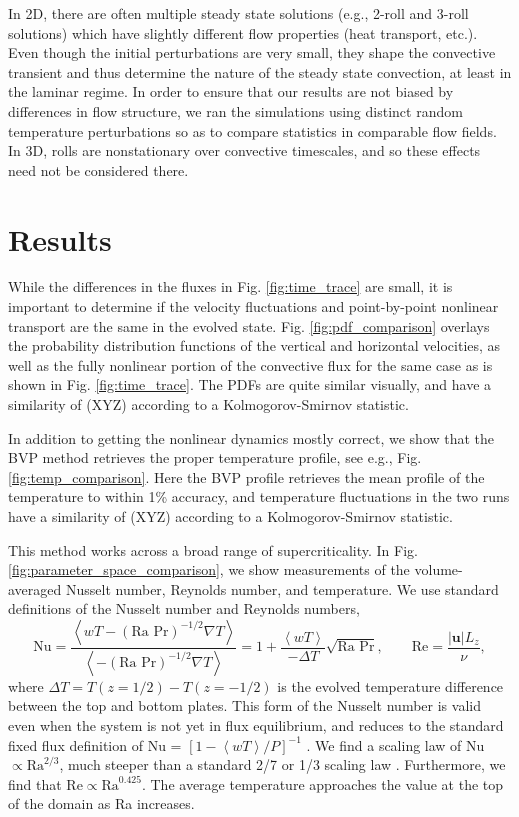 \documentclass[aps, pre, onecolumn, nofootinbib, notitlepage, groupedaddress, amsfonts, amssymb, amsmath, longbibliography]{revtex4-1}
\newcommand{\angles}[1]{\ensuremath{\left\langle #1 \right\rangle}}
\newcommand{\grad}{\ensuremath{\nabla}}
\begin{document}
In 2D, there are often multiple steady state solutions (e.g., 2-roll and 3-roll
solutions) which have slightly different flow properties (heat transport, etc.).
Even though the initial perturbations are very small, they shape the convective
transient and thus determine the nature of the steady state convection, at least in
the laminar regime.  In order to ensure that our results are not biased by differences
in flow structure, we ran the simulations using distinct random temperature perturbations
so as to compare statistics in comparable flow fields.  In 3D, rolls are nonstationary over
convective timescales, and so these effects need not be considered there.

\section{Results}
While the differences in the fluxes in Fig. \ref{fig:time_trace} are small, it is important
to determine if the velocity fluctuations and point-by-point nonlinear transport are the same
in the evolved state.  Fig. \ref{fig:pdf_comparison} overlays the probability distribution functions
of the vertical and horizontal velocities, as well as the fully nonlinear portion of the convective
flux for the same case as is shown in Fig. \ref{fig:time_trace}.  The PDFs are quite similar visually,
and have a similarity of (XYZ) according to a Kolmogorov-Smirnov statistic.

In addition to getting the nonlinear dynamics mostly correct, we show that the BVP method retrieves the
proper temperature profile, see e.g., Fig. \ref{fig:temp_comparison}.  Here the BVP profile retrieves the
mean profile of the temperature to within 1\% accuracy, and temperature fluctuations in the two runs
have a similarity of (XYZ) according to a Kolmogorov-Smirnov statistic.

This method works across a broad range of supercriticality.  In Fig. \ref{fig:parameter_space_comparison},
we show measurements of the volume-averaged Nusselt number, Reynolds number, and temperature.
We use standard definitions of the Nusselt number and Reynolds numbers,
\begin{equation}
\text{Nu} = \frac{\angles{wT - (\text{Ra Pr})^{-1/2}\grad T}}{\angles{- (\text{Ra Pr})^{-1/2} \grad T}} =
1 + \frac{\angles{wT}}{-\Delta T}\sqrt{\text{Ra Pr}}, \qquad \text{Re} = \frac{|\bm{u}| L_z}{\nu},
\end{equation}
where $\Delta T = T(z = 1/2) - T(z = -1/2)$ is the evolved temperature difference
between the top and bottom plates.  This form of the Nusselt number is valid even when
the system is not yet in flux equilibrium, and reduces to the standard fixed flux definition
of Nu  = $[1 - \angles{wT} / P]^{-1}$ \cite{johnston&doering2009}. We find a scaling law of
Nu $\propto \text{Ra}^{2/3}$, much steeper than a standard 2/7 or 1/3 scaling law
\cite{johnston&doering2009}. Furthermore, we find that Re$\propto \text{Ra}^{0.425}$. The average temperature
approaches the value at the top of the domain as Ra increases.  
\end{document}

